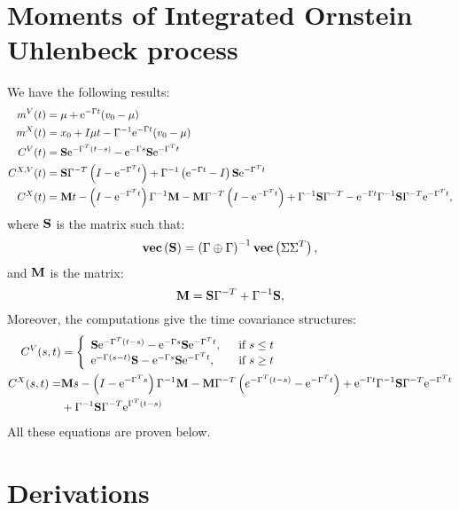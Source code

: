 \section{Moments of Integrated Ornstein Uhlenbeck process}
We have the following results:
\begin{align}
m^V(t) &= \mu + \text{e}^{-\Gamma t} ( v_0 - \mu)\label{eq:mean:OU}\\
m^X(t) &= x_0 + I\mu t - \Gamma^{-1}\text{e}^{-\Gamma t} ( v_0 - \mu)\label{eq:mean:IOU}\\
 C^V(t) &= \mathbf{S}\text{e}^{-\Gamma^T (t - s)} -\text{e}^{-\Gamma s}\mathbf{S} \text{e}^{-\Gamma^T t} \label{eq:var:OU}\\
 C^{X,V}(t) &= \mathbf{S} \Gamma^{-T}\left(I - \text{e}^{-\Gamma^T t}\right) + \Gamma^{-1}\left(\text{e}^{-\Gamma t} - I\right)\mathbf{S}  \text{e}^{-\Gamma^T t} \label{eq:cov:IOU:OU}\\
 C^X(t) &= \mathbf{M} t - \left(I - \text{e}^{-\Gamma^T t}\right)\Gamma^{-1} \mathbf{M} - \mathbf{M}\Gamma^{-T}\left(I - \text{e}^{-\Gamma^T t}\right)+ \Gamma^{-1} \mathbf{S} \Gamma^{-T} - 
   \text{e}^{-\Gamma t}\Gamma^{-1}\mathbf{S}\Gamma^{-T}\text{e}^{-\Gamma^T t}, \label{eq:var:IOU}
\end{align}
where $\mathbf{S}$ is the matrix such that:
 \begin{equation}
\textbf{vec}\left(\mathbf{S} \right) = \left( \Gamma \oplus \Gamma \right)^{-1}\textbf{vec}\left(\Sigma \Sigma^T \right), \label{eq:matrix:S}
\end{equation}
and $\mathbf{M}$ is the matrix:
 \begin{equation}
\mathbf{M}= \mathbf{S}\Gamma^{-T} + \Gamma^{-1}\mathbf{S}, \label{eq:matrix:M}
\end{equation}
Moreover, the computations give the time covariance structures:
\begin{align}
C^V(s, t) &=  \left\lbrace \begin{array}{lr}
 \mathbf{S}\text{e}^{-\Gamma^T (t - s)} -\text{e}^{-\Gamma s}\mathbf{S} \text{e}^{-\Gamma^T t},& ~\text{ if } s \leq t \\
 \text{e}^{-\Gamma (s - t)}\mathbf{S} -\text{e}^{-\Gamma s}\mathbf{S} \text{e}^{-\Gamma^T t},&~\text{ if } s \geq t
\end{array}\right.
\label{eq:time:cov:OU}\\
C^X(s, t) = &\mathbf{M} s - \left(I - \text{e}^{-\Gamma^T s}\right)\Gamma^{-1} \mathbf{M} - \mathbf{M}\Gamma^{-T}\left(e^{-\Gamma^T (t-s)} - \text{e}^{-\Gamma^T t}\right)+
   \text{e}^{-\Gamma t}\Gamma^{-1}\mathbf{S}\Gamma^{-T}\text{e}^{-\Gamma^T t} \nonumber \\
   &+ \Gamma^{-1}\mathbf{S}\Gamma^{-T}\text{e}^{\Gamma^T(t - s)} \label{eq:time:cov:IOU}
\end{align}
 All these equations are proven below.
\section{Derivations}
